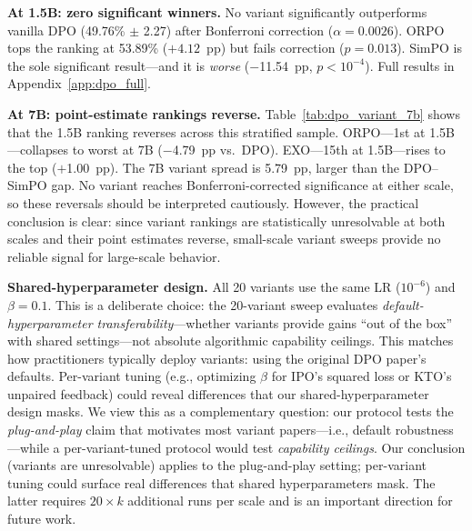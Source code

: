 \documentclass{article}
\begin{document}
\textbf{At 1.5B: zero significant winners.}
No variant significantly outperforms vanilla DPO (49.76\% $\pm$ 2.27) after Bonferroni correction ($\alpha = 0.0026$).
ORPO tops the ranking at 53.89\% ($+4.12$~pp) but fails correction ($p = 0.013$).
SimPO is the sole significant result---and it is \emph{worse} ($-$11.54~pp, $p < 10^{-4}$).
Full results in Appendix~\ref{app:dpo_full}.

\textbf{At 7B: point-estimate rankings reverse.} Table~\ref{tab:dpo_variant_7b} shows that the 1.5B ranking reverses across this stratified sample. ORPO---1st at 1.5B---collapses to worst at 7B ($-$4.79~pp vs.\ DPO). EXO---15th at 1.5B---rises to the top ($+$1.00~pp). The 7B variant spread is 5.79~pp, larger than the DPO--SimPO gap.
No variant reaches Bonferroni-corrected significance at either scale, so these reversals should be interpreted cautiously. However, the practical conclusion is clear: since variant rankings are statistically unresolvable at both scales and their point estimates reverse, small-scale variant sweeps provide no reliable signal for large-scale behavior.

\textbf{Shared-hyperparameter design.} All 20 variants use the same LR ($10^{-6}$) and $\beta = 0.1$. This is a deliberate choice: the 20-variant sweep evaluates \emph{default-hyperparameter transferability}---whether variants provide gains ``out of the box'' with shared settings---not absolute algorithmic capability ceilings. This matches how practitioners typically deploy variants: using the original DPO paper's defaults. Per-variant tuning (e.g., optimizing $\beta$ for IPO's squared loss or KTO's unpaired feedback) could reveal differences that our shared-hyperparameter design masks. We view this as a complementary question: our protocol tests the \emph{plug-and-play} claim that motivates most variant papers---i.e., default robustness---while a per-variant-tuned protocol would test \emph{capability ceilings}. Our conclusion (variants are unresolvable) applies to the plug-and-play setting; per-variant tuning could surface real differences that shared hyperparameters mask. The latter requires $20 \times k$ additional runs per scale and is an important direction for future work.
\end{document}
